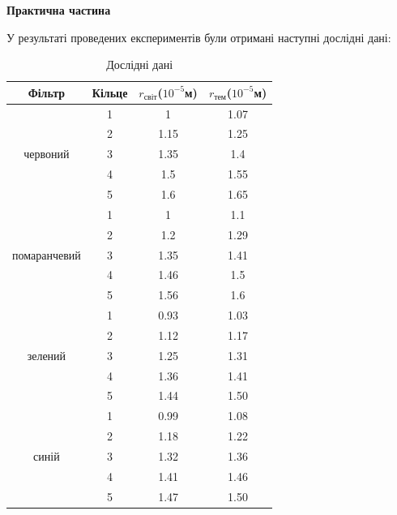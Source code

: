 \begin{center}
    \Large{\textbf{Практична частина}}
\end{center}

\vspace{1mm}

У результаті проведених експериментів 
були отримані наступні дослідні дані:

\begin{table}[h]
    \centering
    \begin{tabular}{|c|c|c|c|}
        \hline
        \textbf{Фільтр} & \textbf{Кільце} & \textbf{$r_{світ}$($10^{-5}$м)} & \textbf{$r_{тем}$($10^{-5}$м)} \\

        \hline
        \multirow{5}{*}{червоний} & 1 & 1 & 1.07 \\
        \cline{2-4}
        & 2 & 1.15 & 1.25 \\
        \cline{2-4}
        & 3 & 1.35 & 1.4 \\
        \cline{2-4}
        & 4 & 1.5 & 1.55 \\
        \cline{2-4}
        & 5 & 1.6 & 1.65 \\
        \hline
        
        \hline
        \multirow{5}{*}{помаранчевий} & 1 & 1 & 1.1 \\
        \cline{2-4}
        & 2 & 1.2 & 1.29  \\
        \cline{2-4}
        & 3 & 1.35 & 1.41 \\
        \cline{2-4}
        & 4 & 1.46 & 1.5  \\
        \cline{2-4}
        & 5 & 1.56 & 1.6  \\ 
        \hline

        \hline
        \multirow{5}{*}{зелений} & 1 & 0.93 & 1.03 \\
        \cline{2-4}
        & 2 & 1.12 & 1.17 \\
        \cline{2-4}
        & 3 & 1.25 & 1.31 \\
        \cline{2-4}
        & 4 & 1.36 & 1.41 \\
        \cline{2-4}
        & 5 & 1.44 & 1.50 \\
        \hline

        \hline
        \multirow{5}{*}{синій} & 1 & 0.99 & 1.08 \\
        \cline{2-4}        
        & 2 & 1.18 & 1.22 \\
        \cline{2-4}
        & 3 & 1.32 & 1.36 \\
        \cline{2-4}
        & 4 & 1.41 & 1.46 \\
        \cline{2-4}
        & 5 & 1.47 & 1.50 \\
        \hline

    \end{tabular}
    \caption{Дослідні дані}
\end{table}

